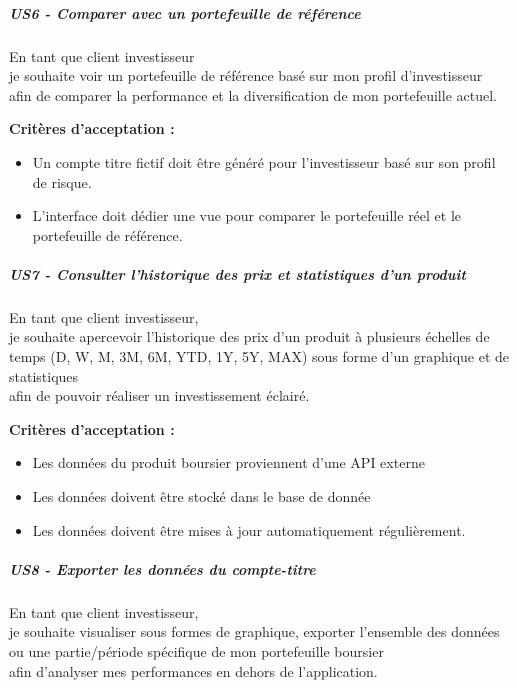 \subparagraph{US6 - Comparer avec un portefeuille de
référence}\label{us6---comparer-avec-un-portefeuille-de-ruxe9fuxe9rence}

En tant que client investisseur\\
je souhaite voir un portefeuille de référence basé sur mon profil
d'investisseur\\
afin de comparer la performance et la diversification de mon
portefeuille actuel.

\textbf{Critères d'acceptation :}

\begin{itemize}
\tightlist
\item
  Un compte titre fictif doit être généré pour l'investisseur basé sur
  son profil de risque.
\item
  L'interface doit dédier une vue pour comparer le portefeuille réel et
  le portefeuille de référence.
\end{itemize}

\subparagraph{US7 - Consulter l'historique des prix et statistiques d'un
produit}\label{us7---consulter-lhistorique-des-prix-et-statistiques-dun-produit}

En tant que client investisseur,\\
je souhaite apercevoir l'historique des prix d'un produit à plusieurs
échelles de temps (D, W, M, 3M, 6M, YTD, 1Y, 5Y, MAX) sous forme d'un
graphique et de statistiques\\
afin de pouvoir réaliser un investissement éclairé.

\textbf{Critères d'acceptation :}

\begin{itemize}
\tightlist
\item
  Les données du produit boursier proviennent d'une API externe
\item
  Les données doivent être stocké dans le base de donnée
\item
  Les données doivent être mises à jour automatiquement régulièrement.
\end{itemize}

\subparagraph{US8 - Exporter les données du
compte-titre}\label{us8---exporter-les-donnuxe9es-du-compte-titre}

En tant que client investisseur,\\
je souhaite visualiser sous formes de graphique, exporter l'ensemble des
données ou une partie/période spécifique de mon portefeuille boursier\\
afin d'analyser mes performances en dehors de l'application.

